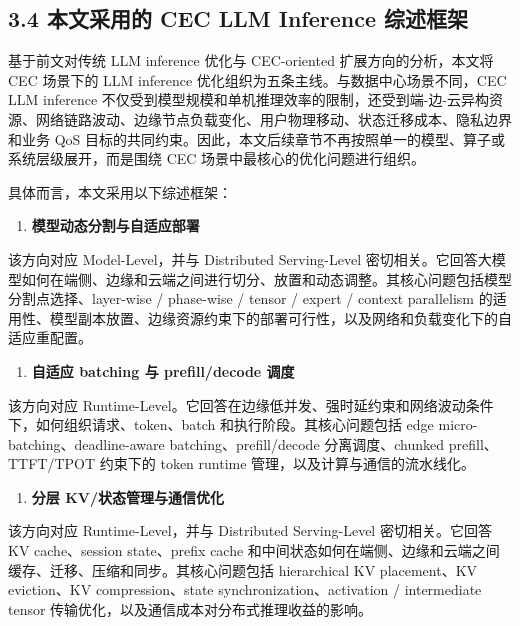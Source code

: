 \documentclass[a4paper,twocolumn,10pt]{ctexart}
\begin{document}
\subsection{3.4 本文采用的 CEC LLM Inference 综述框架}



基于前文对传统 LLM inference 优化与 CEC-oriented 扩展方向的分析，本文将 CEC 场景下的 LLM inference 优化组织为五条主线。与数据中心场景不同，CEC LLM inference 不仅受到模型规模和单机推理效率的限制，还受到端-边-云异构资源、网络链路波动、边缘节点负载变化、用户物理移动、状态迁移成本、隐私边界和业务 QoS 目标的共同约束。因此，本文后续章节不再按照单一的模型、算子或系统层级展开，而是围绕 CEC 场景中最核心的优化问题进行组织。




具体而言，本文采用以下综述框架：


\begin{enumerate}
\item \textbf{模型动态分割与自适应部署}

\end{enumerate}
该方向对应 Model-Level，并与 Distributed Serving-Level 密切相关。它回答大模型如何在端侧、边缘和云端之间进行切分、放置和动态调整。其核心问题包括模型分割点选择、layer-wise / phase-wise / tensor / expert / context parallelism 的适用性、模型副本放置、边缘资源约束下的部署可行性，以及网络和负载变化下的自适应重配置。


\begin{enumerate}
\item \textbf{自适应 batching 与 prefill/decode 调度}

\end{enumerate}
该方向对应 Runtime-Level。它回答在边缘低并发、强时延约束和网络波动条件下，如何组织请求、token、batch 和执行阶段。其核心问题包括 edge micro-batching、deadline-aware batching、prefill/decode 分离调度、chunked prefill、TTFT/TPOT 约束下的 token runtime 管理，以及计算与通信的流水线化。


\begin{enumerate}
\item \textbf{分层 KV/状态管理与通信优化}

\end{enumerate}
该方向对应 Runtime-Level，并与 Distributed Serving-Level 密切相关。它回答 KV cache、session state、prefix cache 和中间状态如何在端侧、边缘和云端之间缓存、迁移、压缩和同步。其核心问题包括 hierarchical KV placement、KV eviction、KV compression、state synchronization、activation / intermediate tensor 传输优化，以及通信成本对分布式推理收益的影响。
\end{document}
